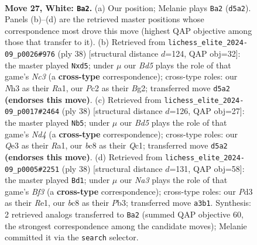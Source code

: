 \documentclass[11pt]{article}
\begin{document}
\clearpage

\begin{figure}[p]\centering
\begin{subfigure}{0.46\textwidth}\centering
\resizebox{\linewidth}{!}{%
\newchessgame
\chessboard[
  setfen={2bq3r/2n1bpk1/p5p1/n1BBp2p/P3P3/N2PQ2N/1rP1RPPP/R4K2 w - - 6 27},
  showmover=false,
  pgfstyle=straightmove, color=movearrow, markmove={d5-a2}
]}
\caption{}
\end{subfigure}\hfill
\begin{subfigure}{0.46\textwidth}\centering
\resizebox{\linewidth}{!}{%
\newchessgame
\chessboard[
  setfen={r2q2k1/3nppbp/p2p2p1/1p1n4/1PrBP3/P1N1Q1PP/5PB1/R1R3K1 w - - 0 20},
  showmover=false,
  pgfstyle=straightmove, color=movearrow, markmove={c3-d5}
]}
\caption{}
\end{subfigure}
\\[4pt]
\begin{subfigure}{0.46\textwidth}\centering
\resizebox{\linewidth}{!}{%
\newchessgame
\chessboard[
  setfen={r3r1k1/1pqn1pb1/6p1/p2n1p1p/P2N4/BPp1P2P/2P2PP1/R1Q1RNK1 w - - 2 20},
  showmover=false,
  pgfstyle=straightmove, color=movearrow, markmove={d4-b5}
]}
\caption{}
\end{subfigure}\hfill
\begin{subfigure}{0.46\textwidth}\centering
\resizebox{\linewidth}{!}{%
\newchessgame
\chessboard[
  setfen={r2q2k1/1ppb1ppn/1b1p3p/p2Pr3/P2N4/1PP1BB1P/3Q1PP1/4RRK1 w - - 9 20},
  showmover=false,
  pgfstyle=straightmove, color=movearrow, markmove={f3-d1}
]}
\caption{}
\end{subfigure}
\caption{\textbf{Move 27, White: \texttt{Ba2}.} (a) Our position; Melanie plays \texttt{Ba2} (\texttt{d5a2}). Panels (b)--(d) are the retrieved master positions whose correspondence most drove this move (highest QAP objective among those that transfer to it). (b) Retrieved from \texttt{lichess\_elite\_2024-09\_p0026\#976} (ply 38) [structural distance $d$=124, QAP obj=32]: the master played \texttt{Nxd5}; under $\mu$ our \emph{Bd5} plays the role of that game's \emph{Nc3} (a \textbf{cross-type} correspondence); cross-type roles: our \emph{N}h3 as their \emph{R}a1, our \emph{P}c2 as their \emph{B}g2; transferred move \texttt{d5a2} \textbf{(endorses this move)}. (c) Retrieved from \texttt{lichess\_elite\_2024-09\_p0017\#2464} (ply 38) [structural distance $d$=126, QAP obj=27]: the master played \texttt{Nb5}; under $\mu$ our \emph{Bd5} plays the role of that game's \emph{Nd4} (a \textbf{cross-type} correspondence); cross-type roles: our \emph{Q}e3 as their \emph{R}a1, our \emph{b}c8 as their \emph{Q}c1; transferred move \texttt{d5a2} \textbf{(endorses this move)}. (d) Retrieved from \texttt{lichess\_elite\_2024-09\_p0005\#2251} (ply 38) [structural distance $d$=131, QAP obj=58]: the master played \texttt{Bd1}; under $\mu$ our \emph{Na3} plays the role of that game's \emph{Bf3} (a \textbf{cross-type} correspondence); cross-type roles: our \emph{P}d3 as their \emph{R}e1, our \emph{b}c8 as their \emph{P}b3; transferred move \texttt{a3b1}. Synthesis: 2 retrieved analogs transferred to \texttt{Ba2} (summed QAP objective 60, the strongest correspondence among the candidate moves); Melanie committed it via the \texttt{search} selector.}

\end{figure}
\end{document}
